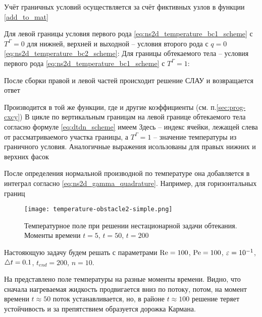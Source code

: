 Учёт граничных условий осуществляется за счёт фиктивных узлов
в функции \cref{add_to_mat}

Для левой границы условия первого рода
\cref{eq:ns2d_temperature_bc1_scheme} с $T^\Gamma = 0$
для нижней, верхней и выходной -- 
условия второго рода с $q=0$ \cref{eq:ns2d_temperature_bc2_scheme}:
Для границы обтекаемого тела -- условия первого рода
\cref{eq:ns2d_temperature_bc1_scheme} с $T^\Gamma = 1$:

После сборки правой и левой частей происходит
решение СЛАУ и возвращается ответ

Производится в той же функции, где и другие коэффициенты (см. п.\ref{sec:prog-cxcy})
В цикле по вертикальным границам
на левой границе обтекаемого тела согласно формуле
\cref{eq:dtdn_scheme} имеем
Здесь  -- индекс ячейки, лежащей слева от рассматриваемого участка границы,
а $T^\Gamma = 1$ -- значение температуры из граничного условия.
Аналогичные выражения исользованы для правых
нижних
и верхних фасок

После определения нормальной производной по температуре
она добавляется в интеграл согласно \cref{eq:ns2d_gamma_quadrature}.
Например, для горизонтальных границ


\begin{figure}[h!]
\centering
\texttt{[image: temperature-obstacle2-simple.png]}
\caption{Температурное поле при решении нестационарной задачи обтекания. Моменты времени $t=5$, $t=50$, $t=200$}
\label{fig:temperature-obstacle2-simple}
\end{figure}

Настояющую задачу будем решать с параметрами
$\mathrm{Re} = 100$, $\mathrm{Pe} = 100$, $\varepsilon=10^{-1}$, $\triangle t = 0.1$, $t_{end} = 200$, $n=10$.

На 
представлено поле температуры на разные моменты времени.
Видно, что сначала нагреваемая жидкость продвигается вниз по потоку,
потом, на момент времени $t\approx50$ поток устанавливается,
но, в районе $t\approx100$ решение теряет устойчивость
и за препятствием образуется дорожка Кармана.

